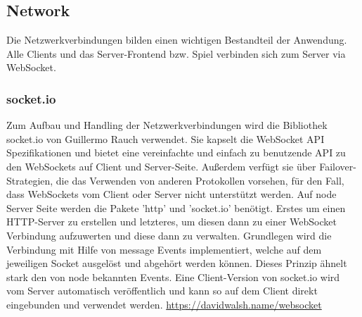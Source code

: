 \documentclass[a4paper]{spie}  %
\begin{document}
\subsection{Network}
Die Netzwerkverbindungen bilden einen wichtigen Bestandteil der Anwendung. Alle Clients und das Server-Frontend bzw. Spiel verbinden sich zum Server via WebSocket.

\subsubsection{socket.io}
Zum Aufbau und Handling der Netzwerkverbindungen wird die Bibliothek socket.io von Guillermo Rauch verwendet. Sie kapselt die WebSocket API Spezifikationen und bietet eine vereinfachte und einfach zu benutzende API zu den WebSockets auf Client und Server-Seite. Außerdem verfügt sie über Failover-Strategien, die das Verwenden von anderen Protokollen vorsehen, für den Fall, dass WebSockets vom Client oder Server nicht unterstützt werden.
Auf node Server Seite werden die Pakete 'http' und 'socket.io' benötigt. Erstes um einen HTTP-Server zu erstellen und letzteres, um diesen dann zu einer WebSocket Verbindung aufzuwerten und diese dann zu verwalten. Grundlegen wird die Verbindung mit Hilfe von message Events implementiert, welche auf dem jeweiligen Socket ausgelöst und abgehört werden können. Dieses Prinzip ähnelt stark den von node bekannten Events. Eine Client-Version von socket.io wird vom Server automatisch veröffentlich und kann so auf dem Client direkt eingebunden und verwendet werden.
\url{https://davidwalsh.name/websocket}
\end{document}
